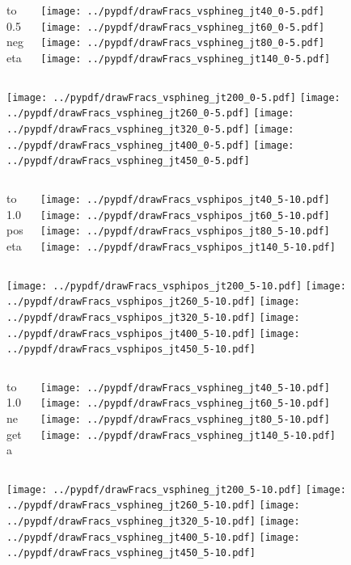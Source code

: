 \documentclass[aspectratio=169]{beamer}
\begin{document}
\begin{figure}[p]
\flushleft
\begin{columns}[T]
\begin{column}{.2\linewidth}
 to 0.5 negeta
\end{column}
\begin{column}{.8\linewidth}
\texttt{[image: ../pypdf/drawFracs\_vsphineg\_jt40\_0-5.pdf]}
\texttt{[image: ../pypdf/drawFracs\_vsphineg\_jt60\_0-5.pdf]}
\texttt{[image: ../pypdf/drawFracs\_vsphineg\_jt80\_0-5.pdf]}
\texttt{[image: ../pypdf/drawFracs\_vsphineg\_jt140\_0-5.pdf]}
\end{column}
\end{columns}
\texttt{[image: ../pypdf/drawFracs\_vsphineg\_jt200\_0-5.pdf]}
\texttt{[image: ../pypdf/drawFracs\_vsphineg\_jt260\_0-5.pdf]}
\texttt{[image: ../pypdf/drawFracs\_vsphineg\_jt320\_0-5.pdf]}
\texttt{[image: ../pypdf/drawFracs\_vsphineg\_jt400\_0-5.pdf]}
\texttt{[image: ../pypdf/drawFracs\_vsphineg\_jt450\_0-5.pdf]}
\end{figure}

\begin{figure}[p]
\flushleft
\begin{columns}[T]
\begin{column}{.2\linewidth}
 to 1.0 poseta
\end{column}
\begin{column}{.8\linewidth}
\texttt{[image: ../pypdf/drawFracs\_vsphipos\_jt40\_5-10.pdf]}
\texttt{[image: ../pypdf/drawFracs\_vsphipos\_jt60\_5-10.pdf]}
\texttt{[image: ../pypdf/drawFracs\_vsphipos\_jt80\_5-10.pdf]}
\texttt{[image: ../pypdf/drawFracs\_vsphipos\_jt140\_5-10.pdf]}
\end{column}
\end{columns}
\texttt{[image: ../pypdf/drawFracs\_vsphipos\_jt200\_5-10.pdf]}
\texttt{[image: ../pypdf/drawFracs\_vsphipos\_jt260\_5-10.pdf]}
\texttt{[image: ../pypdf/drawFracs\_vsphipos\_jt320\_5-10.pdf]}
\texttt{[image: ../pypdf/drawFracs\_vsphipos\_jt400\_5-10.pdf]}
\texttt{[image: ../pypdf/drawFracs\_vsphipos\_jt450\_5-10.pdf]}
\end{figure}

\begin{figure}[p]
\flushleft
\begin{columns}[T]
\begin{column}{.2\linewidth}
 to 1.0 negeta
\end{column}
\begin{column}{.8\linewidth}
\texttt{[image: ../pypdf/drawFracs\_vsphineg\_jt40\_5-10.pdf]}
\texttt{[image: ../pypdf/drawFracs\_vsphineg\_jt60\_5-10.pdf]}
\texttt{[image: ../pypdf/drawFracs\_vsphineg\_jt80\_5-10.pdf]}
\texttt{[image: ../pypdf/drawFracs\_vsphineg\_jt140\_5-10.pdf]}
\end{column}
\end{columns}
\texttt{[image: ../pypdf/drawFracs\_vsphineg\_jt200\_5-10.pdf]}
\texttt{[image: ../pypdf/drawFracs\_vsphineg\_jt260\_5-10.pdf]}
\texttt{[image: ../pypdf/drawFracs\_vsphineg\_jt320\_5-10.pdf]}
\texttt{[image: ../pypdf/drawFracs\_vsphineg\_jt400\_5-10.pdf]}
\texttt{[image: ../pypdf/drawFracs\_vsphineg\_jt450\_5-10.pdf]}
\end{figure}
\end{document}
